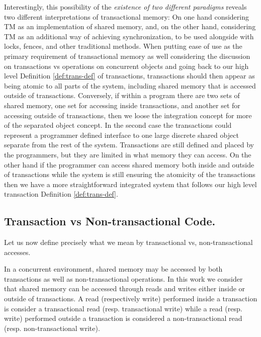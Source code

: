 Interestingly, this possibility of the {\it existence of two different paradigms} reveals
two different interpretations of transactional memory: On one hand considering TM as an implementation
of shared memory, and, on the other hand, considering TM as an additional way of achieving synchronization, 
to be used alongside with locks, fences, and other traditional methods.
When putting ease of use as the primary requirement of transactional memory
as well considering the discussion on transactions vs operations on concurrent objects
and going back to our high level Definition \ref{def:trans-def} of transactions,
transactions should then appear as being atomic to all parts of the system,
including shared memory that is accessed outside of transactions.
Conversely, if within a program there are two sets of shared memory, one set for accessing inside
transactions, and another set for accessing outside of transactions, then we loose 
the integration concept for more of the separated object concept.
In the second case the transactions could represent a programmer defined
interface to one large discrete shared object separate from the rest of the system.
Transactions are still defined and placed by the programmers, but they are limited
in what memory they can access.
On the other hand if the programmer can access shared memory both inside and outside
of transactions while the system is still ensuring the atomicity of the transactions then
we have a more straightforward integrated system that follows our high level transaction
Definition \ref{def:trans-def}.

\subsection{Transaction vs Non-transactional Code.}
\label{sec:TvNT}
Let us now define precisely what we mean by transactional vs, non-transactional
accesses.

In a  concurrent environment,  shared memory  may  be
accessed by both transactions as well as  
non-transactional operations. %
In this work we consider that shared memory can be accessed through
reads and writes either inside or outside of transactions.
A read (respectively write) performed inside a transaction is consider
a transactional read (resp. transactional write) while a read (resp. write)
performed outside a transaction is considered a non-transactional read
(resp. non-transactional write).

